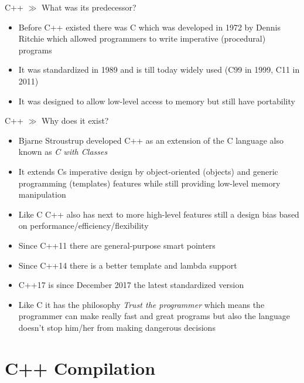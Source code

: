 \documentclass[10pt]{beamer}
\begin{document}
\begin{frame}{C++ $\gg$ What was its predecessor?}
\begin{itemize}
	\item Before C++ existed there was C which was developed in 1972 by Dennis Ritchie which allowed programmers to write imperative (procedural) programs
	\item It was standardized in 1989 and is till today widely used (C99 in 1999, C11 in 2011)
	\item It was designed to allow low-level access to memory but still have portability
\end{itemize}
\end{frame}

\begin{frame}{C++ $\gg$ Why does it exist?}
\begin{itemize}
	\item Bjarne Stroustrup developed C++ as an extension of the C language also known as \textit{C with Classes}
	\item It extends Cs imperative design by object-oriented (objects) and generic programming (templates) features while still providing low-level memory manipulation
	\item Like C C++ also has next to more high-level features still a design bias based on performance/efficiency/flexibility
	\item Since C++11 there are general-purpose smart pointers
	\item Since C++14 there is a better template and lambda support
	\item C++17 is since December 2017 the latest standardized version
	\item Like C it has the philosophy \textit{Trust the programmer} which means the programmer can make really fast and great programs but also the language doesn't stop him/her from making dangerous decisions 
\end{itemize}
\end{frame}

\section{C++ Compilation}
\end{document}
